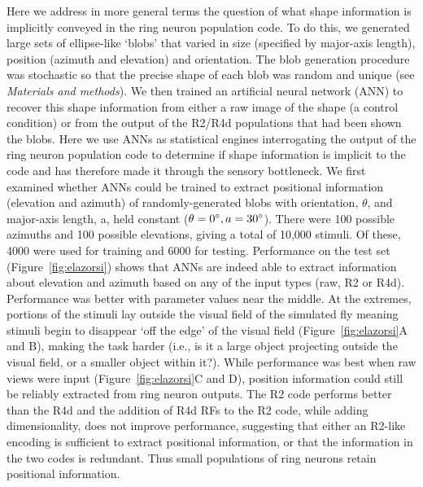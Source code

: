 Here we address in more general terms the question of what shape information is implicitly conveyed in the ring neuron population code. To do this, we generated large sets of ellipse-like ‘blobs’  that varied in size (specified by major-axis length), position (azimuth and elevation) and orientation. The blob generation procedure was stochastic so that the precise shape of each blob was random and unique (see \emph{Materials and methods}). We then trained an artificial neural network (ANN) to recover this shape information from either a raw image of the shape (a control condition) or from the output of the R2/R4d populations that had been shown the blobs. Here we use ANNs as statistical engines interrogating the output of the ring neuron population code to determine if shape information is implicit to the code and has therefore made it through the sensory bottleneck. We first examined whether ANNs could be trained to extract positional information (elevation and azimuth) of randomly-generated blobs with orientation, $\theta$, and major-axis length, a, held constant ($\theta=0\degree, a = 30\degree$). There were 100 possible azimuths and 100 possible elevations, giving a total of 10,000 stimuli. Of these, 4000 were used for training and 6000 for testing. Performance on the test set (Figure~\ref{fig:elazorsi}) shows that ANNs are indeed able to extract information about elevation and azimuth based on any of the input types (raw, R2 or R4d). Performance was better with parameter values near the middle. At the extremes, portions of the stimuli lay outside the visual field of the simulated fly meaning stimuli begin to disappear ‘off the edge’ of the visual field (Figure~\ref{fig:elazorsi}A and B), making the task harder (i.e., is it a large object projecting outside the visual field, or a smaller object within it?). While performance was best when raw views were input (Figure~\ref{fig:elazorsi}C and D), position information could still be reliably extracted from ring neuron outputs. The R2 code performs better than the R4d and the addition of R4d RFs to the R2 code, while adding dimensionality, does not improve performance, suggesting that either an R2-like encoding is sufficient to extract positional information, or that the information in the two codes is redundant. Thus small populations of ring neurons retain positional information.

